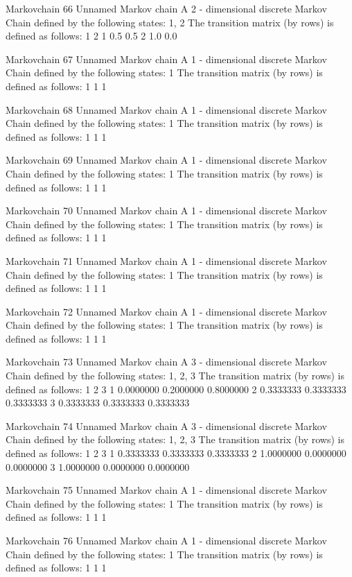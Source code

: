 \documentclass[
  nojss]{jss}
\begin{document}
\begin{CodeChunk}
\begin{CodeOutput}
Markovchain  66 
Unnamed Markov chain 
 A  2 - dimensional discrete Markov Chain defined by the following states: 
 1, 2 
 The transition matrix  (by rows)  is defined as follows: 
    1   2
1 0.5 0.5
2 1.0 0.0

Markovchain  67 
Unnamed Markov chain 
 A  1 - dimensional discrete Markov Chain defined by the following states: 
 1 
 The transition matrix  (by rows)  is defined as follows: 
  1
1 1

Markovchain  68 
Unnamed Markov chain 
 A  1 - dimensional discrete Markov Chain defined by the following states: 
 1 
 The transition matrix  (by rows)  is defined as follows: 
  1
1 1

Markovchain  69 
Unnamed Markov chain 
 A  1 - dimensional discrete Markov Chain defined by the following states: 
 1 
 The transition matrix  (by rows)  is defined as follows: 
  1
1 1

Markovchain  70 
Unnamed Markov chain 
 A  1 - dimensional discrete Markov Chain defined by the following states: 
 1 
 The transition matrix  (by rows)  is defined as follows: 
  1
1 1

Markovchain  71 
Unnamed Markov chain 
 A  1 - dimensional discrete Markov Chain defined by the following states: 
 1 
 The transition matrix  (by rows)  is defined as follows: 
  1
1 1

Markovchain  72 
Unnamed Markov chain 
 A  1 - dimensional discrete Markov Chain defined by the following states: 
 1 
 The transition matrix  (by rows)  is defined as follows: 
  1
1 1

Markovchain  73 
Unnamed Markov chain 
 A  3 - dimensional discrete Markov Chain defined by the following states: 
 1, 2, 3 
 The transition matrix  (by rows)  is defined as follows: 
          1         2         3
1 0.0000000 0.2000000 0.8000000
2 0.3333333 0.3333333 0.3333333
3 0.3333333 0.3333333 0.3333333

Markovchain  74 
Unnamed Markov chain 
 A  3 - dimensional discrete Markov Chain defined by the following states: 
 1, 2, 3 
 The transition matrix  (by rows)  is defined as follows: 
          1         2         3
1 0.3333333 0.3333333 0.3333333
2 1.0000000 0.0000000 0.0000000
3 1.0000000 0.0000000 0.0000000

Markovchain  75 
Unnamed Markov chain 
 A  1 - dimensional discrete Markov Chain defined by the following states: 
 1 
 The transition matrix  (by rows)  is defined as follows: 
  1
1 1

Markovchain  76 
Unnamed Markov chain 
 A  1 - dimensional discrete Markov Chain defined by the following states: 
 1 
 The transition matrix  (by rows)  is defined as follows: 
  1
1 1


\end{CodeOutput}
\end{CodeChunk}
\end{document}
